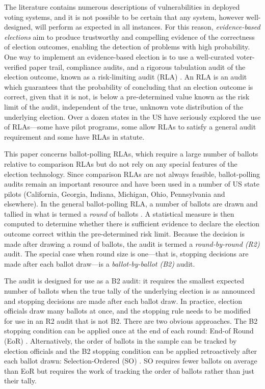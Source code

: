 The literature contains numerous descriptions of vulnerabilities in deployed voting systems, and it is not possible to be certain that any system, however well-designed, will perform as expected in all instances. For this reason, 
{\em evidence-based elections} \cite{evidence-based} aim to produce trustworthy and compelling evidence of the correctness of election outcomes, enabling the detection of problems with high probability. One way to implement an evidence-based election is to use a well-curated voter-verified paper trail, compliance audits, and a rigorous tabulation audit of the election outcome, known as a risk-limiting audit (RLA) \cite{RLA}. An RLA is an audit which guarantees that the probability of concluding that an election outcome is correct, given that it is not, is below a pre-determined value known as the risk limit of the audit, independent of the true, unknown vote distribution of the underlying election. Over a dozen states in the US have seriously explored the use of RLAs---some have pilot programs, some allow RLAs to satisfy a general audit requirement and some have RLAs in statute.     

This paper concerns ballot-polling RLAs, which require a large number of ballots relative to comparison RLAs but do not rely on any special features of the election technology. Since comparison RLAs are not always feasible, ballot-polling audits remain an important resource and have been used in a number of US state pilots (California, Georgia, Indiana, Michigan, Ohio, Pennsylvania and elsewhere). In the general ballot-polling RLA, a number of ballots are drawn and tallied in what is termed a {\em round} of ballots \cite{usenix_minerva}. A statistical measure is then computed to determine whether there is sufficient evidence to declare the election outcome correct within the pre-determined risk limit. Because the decision is made after drawing a round of ballots, the audit is termed a {\em round-by-round (R2)} audit. The special case when round size is one---that is, stopping decisions are made after each ballot draw---is a {\em ballot-by-ballot (B2)} audit.

The \BRAVO audit is designed for use as a B2 audit: it requires the smallest expected number of ballots when the true tally of the underlying election is as announced and stopping decisions are made after each ballot draw. In practice, election officials draw many ballots at once, and the \BRAVO stopping rule needs to be modified for use in an R2 audit that is not B2. There are two obvious approaches. The B2 stopping condition can be applied once at the end of each round: End-of Round (EoR) \BRAVO.  Alternatively, the order of ballots in the sample can be tracked by election officials and the B2 \BRAVO stopping condition can be applied retroactively after each ballot drawn: Selection-Ordered (SO) \BRAVO. SO \BRAVO requires fewer ballots on average than EoR \BRAVO but requires the work of tracking the order of ballots rather than just their tally. 

